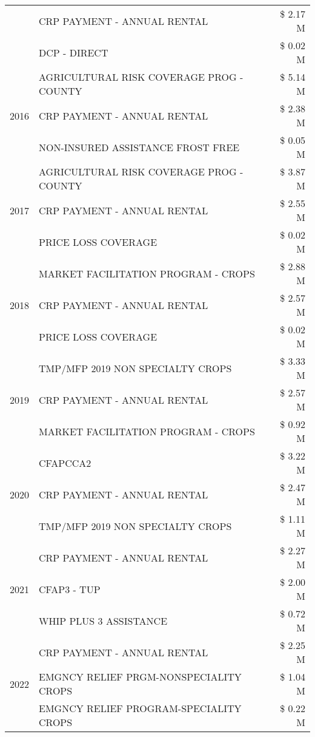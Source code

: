 \begin{tabular}{llr}
 & CRP PAYMENT - ANNUAL RENTAL & \$ 2.17 M \\
 & DCP - DIRECT & \$ 0.02 M \\
\cline{1-3}
\multirow[t]{3}{*}{2016} & AGRICULTURAL RISK COVERAGE PROG - COUNTY & \$ 5.14 M \\
 & CRP PAYMENT - ANNUAL RENTAL & \$ 2.38 M \\
 & NON-INSURED ASSISTANCE FROST FREE & \$ 0.05 M \\
\cline{1-3}
\multirow[t]{3}{*}{2017} & AGRICULTURAL RISK COVERAGE PROG - COUNTY & \$ 3.87 M \\
 & CRP PAYMENT - ANNUAL RENTAL & \$ 2.55 M \\
 & PRICE LOSS COVERAGE & \$ 0.02 M \\
\cline{1-3}
\multirow[t]{3}{*}{2018} & MARKET FACILITATION PROGRAM - CROPS & \$ 2.88 M \\
 & CRP PAYMENT - ANNUAL RENTAL & \$ 2.57 M \\
 & PRICE LOSS COVERAGE & \$ 0.02 M \\
\cline{1-3}
\multirow[t]{3}{*}{2019} & TMP/MFP 2019 NON SPECIALTY CROPS & \$ 3.33 M \\
 & CRP PAYMENT - ANNUAL RENTAL & \$ 2.57 M \\
 & MARKET FACILITATION PROGRAM - CROPS & \$ 0.92 M \\
\cline{1-3}
\multirow[t]{3}{*}{2020} & CFAPCCA2 & \$ 3.22 M \\
 & CRP PAYMENT - ANNUAL RENTAL & \$ 2.47 M \\
 & TMP/MFP 2019 NON SPECIALTY CROPS & \$ 1.11 M \\
\cline{1-3}
\multirow[t]{3}{*}{2021} & CRP PAYMENT - ANNUAL RENTAL & \$ 2.27 M \\
 & CFAP3 - TUP & \$ 2.00 M \\
 & WHIP PLUS 3 ASSISTANCE & \$ 0.72 M \\
\cline{1-3}
\multirow[t]{3}{*}{2022} & CRP PAYMENT - ANNUAL RENTAL & \$ 2.25 M \\
 & EMGNCY RELIEF PRGM-NONSPECIALITY CROPS & \$ 1.04 M \\
 & EMGNCY RELIEF PROGRAM-SPECIALITY CROPS & \$ 0.22 M \\
\cline{1-3}
\bottomrule
\end{tabular}
